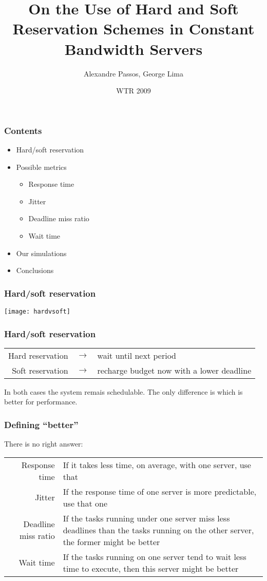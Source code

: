 \documentclass{beamer}
\title{On the Use of Hard and Soft Reservation Schemes in Constant Bandwidth Servers}
\author{Alexandre Passos, George Lima}
\date{WTR 2009}
\institute{DCC-UFBA}
\begin{document}
\maketitle

\begin{frame}
  \frametitle{Contents}
  \begin{itemize}
  \item Hard/soft reservation
  \item Possible metrics
    \begin{itemize}
    \item Response time
    \item Jitter
    \item Deadline miss ratio
    \item Wait time
    \end{itemize}
  \item Our simulations
  \item Conclusions
  \end{itemize}
\end{frame}

\begin{frame}
  \frametitle{Hard/soft reservation}
  
  \texttt{[image: hardvsoft]}
\end{frame}

\begin{frame}
  \frametitle{Hard/soft reservation}
  
  \begin{tabular}[t]{rcl}
    Hard reservation &$\rightarrow$& wait until next period \\  
    Soft reservation& $\rightarrow$& recharge budget now with a lower deadline
  \end{tabular}

\vspace{2cm}
  In both cases the system remais schedulable. The only difference is
  which is better for performance.

\end{frame}


\begin{frame}
  \frametitle{Defining ``better''}
  
  There is no right answer:
\vspace{0.5cm}

  \begin{tabular}[t]{rp{7cm}}
    Response time & If it takes less time, on average, with one
    server, use that \\
    Jitter & If the response time of one server is more predictable,
    use that one \\
    Deadline miss ratio & If the tasks running under one server miss
    less deadlines than the tasks running on the other server, the
    former might be better \\
    Wait time & If the tasks running on one server tend to wait less
    time to execute, then this server might be better
  \end{tabular}
  
\end{frame}
\end{document}
